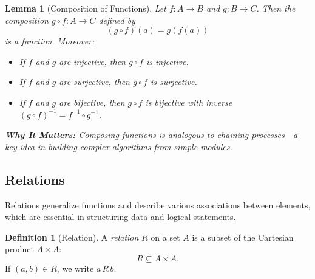 \documentclass[12pt]{article}
\newtheorem{lemma}[theorem]{Lemma}
\theoremstyle{definition}
\newtheorem{definition}[theorem]{Definition}
\begin{document}
\begin{center}
\end{center}

\begin{lemma}[Composition of Functions]
  Let \(f: A \to B\) and \(g: B \to C\). Then the composition \(g \circ f: A \to C\) defined by
  \[
  (g \circ f)(a) = g(f(a))
  \]
  is a function. Moreover:
  \begin{itemize}
    \item If \(f\) and \(g\) are injective, then \(g \circ f\) is injective.
    \item If \(f\) and \(g\) are surjective, then \(g \circ f\) is surjective.
    \item If \(f\) and \(g\) are bijective, then \(g \circ f\) is bijective with inverse \((g \circ f)^{-1} = f^{-1} \circ g^{-1}\).
  \end{itemize}
  \vspace{0.5em}
  \textbf{Why It Matters:} Composing functions is analogous to chaining processes—a key idea in building complex algorithms from simple modules.
\end{lemma}

\subsection{Relations}

Relations generalize functions and describe various associations between elements, which are essential in structuring data and logical statements.

\begin{definition}[Relation]
  A \emph{relation} \(R\) on a set \(A\) is a subset of the Cartesian product \(A \times A\):
  \[
  R \subseteq A \times A.
  \]
  If \((a,b) \in R\), we write \(a\,R\,b\).
\end{definition}
\end{document}
